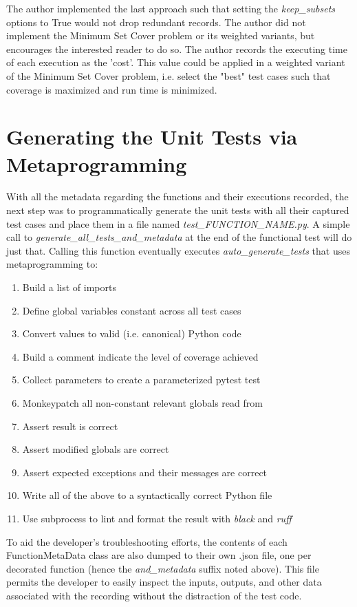 The author implemented the last approach such that setting the \textit{keep\_subsets}
options to True would not drop redundant records.  The author did not implement 
the Minimum Set Cover problem or its weighted variants, but encourages 
the interested reader to do so.  The author records the executing time of each 
execution as the 'cost'. This value could be applied in a weighted 
variant of the Minimum Set Cover problem, i.e. select the "best" test cases
such that coverage is maximized and run time is minimized.
   
\section{Generating the Unit Tests via Metaprogramming}\label{sec:generating-tests}

With all the metadata regarding the functions and their executions recorded, 
the next step was to programmatically generate the unit tests with all their 
captured test cases and place them in a file named 
\textit{test_FUNCTION\_NAME.py}. 
A simple call to \textit{generate\_all\_tests\_and\_metadata} at the end of 
the functional test will do just that.
 Calling this function eventually executes 
\textit{auto\_generate\_tests} that uses metaprogramming to:
\begin{enumerate}[leftmargin=*]
  \item Build a list of imports
  \item Define global variables constant across all test cases
  \item Convert values to valid (i.e. canonical) Python code
  \item Build a comment indicate the level of coverage achieved
  \item Collect parameters to create a parameterized pytest test
  \item Monkeypatch all non-constant relevant globals read from
  \item Assert result is correct
  \item Assert modified globals are correct
  \item Assert expected exceptions and their messages are correct
  \item Write all of the above to a syntactically correct Python file
  \item Use subprocess to lint and format the result with \textit{black} and \textit{ruff}
\end{enumerate}

To aid the developer's troubleshooting efforts, the contents of each FunctionMetaData
class are also dumped to their own .json file, one per decorated function (hence
the \textit{and\_metadata} suffix noted above).  This file permits the 
developer to easily inspect the inputs, outputs, and other data
associated with the recording without the distraction of the test code.

